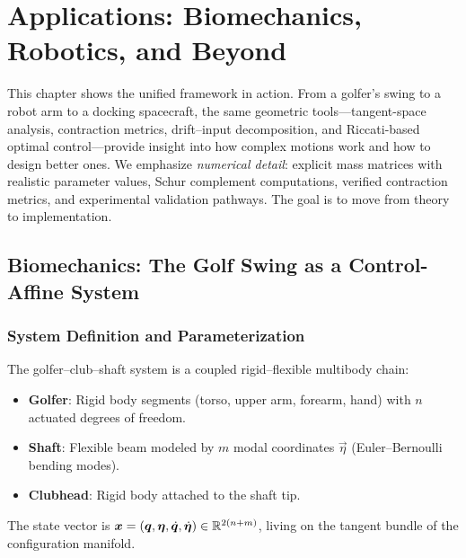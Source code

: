 \chapter{Applications: Biomechanics, Robotics, and Beyond}
\label{ch:applications}

\begin{laymansbox}
This chapter shows the unified framework in action. From a golfer's swing to a robot
arm to a docking spacecraft, the same geometric tools---tangent-space analysis,
contraction metrics, drift--input decomposition, and Riccati-based optimal control---provide
insight into how complex motions work and how to design better ones. We emphasize
\emph{numerical detail}: explicit mass matrices with realistic parameter values, Schur
complement computations, verified contraction metrics, and experimental validation
pathways. The goal is to move from theory to implementation.
\end{laymansbox}

\section{Biomechanics: The Golf Swing as a Control-Affine System}

\subsection{System Definition and Parameterization}

The golfer--club--shaft system is a coupled rigid--flexible multibody chain:
\begin{itemize}
\item \textbf{Golfer}: Rigid body segments (torso, upper arm, forearm, hand) with
$n$ actuated degrees of freedom.
\item \textbf{Shaft}: Flexible beam modeled by $m$ modal coordinates $\vec\eta$
(Euler--Bernoulli bending modes).
\item \textbf{Clubhead}: Rigid body attached to the shaft tip.
\end{itemize}

The state vector is $\bm{x} = (\bm{q}, \bm{\eta}, \dot{\bm{q}}, \dot{\bm{\eta}}) \in \mathbb{R}^{2(n+m)}$,
living on the tangent bundle of the configuration manifold.

